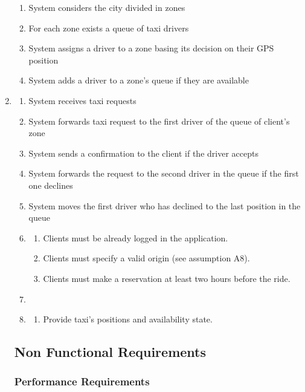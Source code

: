 \documentclass[a4paper]{article}
\begin{document}
\begin{enumerate}[label=\bfseries G\arabic*:]
\begin{enumerate}[label=\bfseries R\arabic*:]
        \item System considers the city divided in zones
        \item For each zone exists a queue of taxi drivers
        \item System assigns a driver to a zone basing its decision on their GPS position
        \item System adds a driver to a zone's queue if they are available
        \end{enumerate}
    \item 
        \begin{enumerate}[label=\bfseries R\arabic*:]
        \item System receives taxi requests
        \item System forwards taxi request to the first driver of the queue of client's zone
        \item System sends a confirmation to the client if the driver accepts
        \item System forwards the request to the second driver in the queue if the first one declines
        \item System moves the first driver who has declined to the last position in the queue
    \item
        \begin{enumerate}[label=\bfseries R\arabic*:]
        \item Clients must be already logged in the application.
        \item Clients must specify a valid origin (see assumption A8).
        \item Clients must make a reservation at least two hours before the ride.
        \end{enumerate}
    \item {}
    \item
        \begin{enumerate}[label=\bfseries R\arabic*:]
        \item Provide taxi's positions and availability state.
        \end{enumerate}
\end{enumerate}

\subsection{Non Functional Requirements}

\subsubsection{Performance Requirements}


\end{enumerate}
\end{document}
